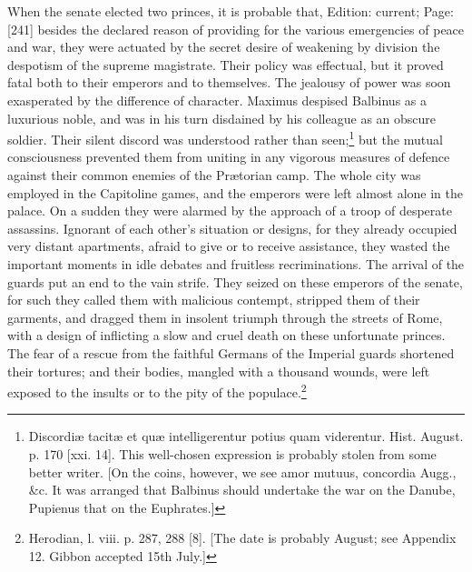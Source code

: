 When the senate elected two princes, it is probable that, Edition: current; Page: [241] besides the declared reason of providing for the various emergencies of peace and war, they were actuated by the secret desire of weakening by division the despotism of the supreme magistrate. Their policy was effectual, but it proved fatal both to their emperors and to themselves. The jealousy of power was soon exasperated by the difference of character. Maximus despised Balbinus as a luxurious noble, and was in his turn disdained by his colleague as an obscure soldier. Their silent discord was understood rather than seen;\footnote{Discordiæ tacitæ et quæ intelligerentur potius quam viderentur. Hist. August. p. 170 [xxi. 14]. This well-chosen expression is probably stolen from some better writer. [On the coins, however, we see amor mutuus, concordia Augg., \&c. It was arranged that Balbinus should undertake the war on the Danube, Pupienus that on the Euphrates.]} but the mutual consciousness prevented them from uniting in any vigorous measures of defence against their common enemies of the Prætorian camp. The whole city was employed in the Capitoline games, and the emperors were left almost alone in the palace. On a sudden they were alarmed by the approach of a troop of desperate assassins. Ignorant of each other\texthebrew{}’s situation or designs, for they already occupied very distant apartments, afraid to give or to receive assistance, they wasted the important moments in idle debates and fruitless recriminations. The arrival of the guards put an end to the vain strife. They seized on these emperors of the senate, for such they called them with malicious contempt, stripped them of their garments, and dragged them in insolent triumph through the streets of Rome, with a design of inflicting a slow and cruel death on these unfortunate princes. The fear of a rescue from the faithful Germans of the Imperial guards shortened their tortures; and their bodies, mangled with a thousand wounds, were left exposed to the insults or to the pity of the populace.\footnote{Herodian, l. viii. p. 287, 288 [8]. [The date is probably August; see Appendix 12. Gibbon accepted 15th July.]}

